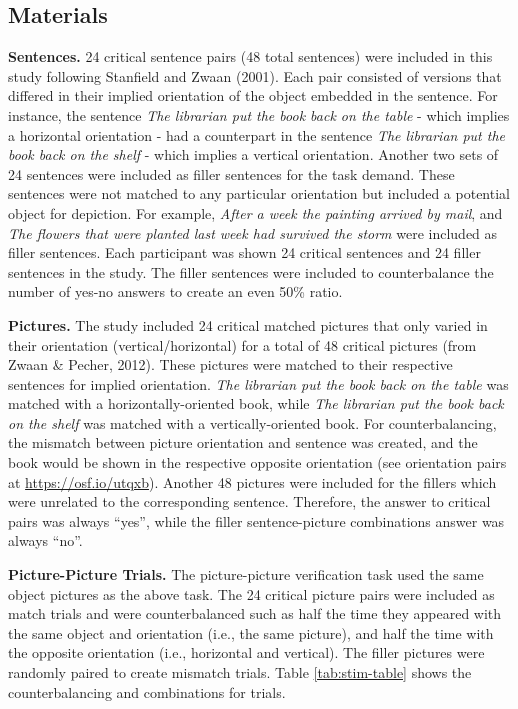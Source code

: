 \documentclass[
  man,floatsintext]{apa7}
\begin{document}
\hypertarget{materials}{%
\subsection{Materials}\label{materials}}

\textbf{Sentences.} 24 critical sentence pairs (48 total sentences) were
included in this study following Stanfield and Zwaan (2001). Each pair
consisted of versions that differed in their implied orientation of the
object embedded in the sentence. For instance, the sentence \emph{The librarian put the book back on the table} - which implies a horizontal
orientation - had a counterpart in the sentence \emph{The librarian put the book back on the shelf} - which implies a vertical orientation. Another two sets of 24 sentences were included as filler sentences for the task demand. These sentences were not matched to any particular orientation but included a potential object for depiction. For example,
\emph{After a week the painting arrived by mail}, and
\emph{The flowers that were planted last week had survived the storm} were included as filler sentences. Each
participant was shown 24 critical sentences and 24 filler sentences in
the study. The filler sentences were included to counterbalance the
number of yes-no answers to create an even 50\% ratio.

\textbf{Pictures.} The study included 24 critical matched pictures that only
varied in their orientation (vertical/horizontal) for a total of 48
critical pictures (from Zwaan \& Pecher, 2012). These pictures were matched to their respective
sentences for implied orientation. \emph{The librarian put the book back on
the table} was matched with a horizontally-oriented book, while \emph{The
librarian put the book back on the shelf} was matched with a
vertically-oriented book. For counterbalancing, the mismatch between
picture orientation and sentence was created, and the book would be
shown in the respective opposite orientation (see orientation pairs at
\url{https://osf.io/utqxb}). Another 48 pictures were included for the
fillers which were unrelated to the corresponding sentence. Therefore,
the answer to critical pairs was always ``yes'', while the filler
sentence-picture combinations answer was always ``no''.

\textbf{Picture-Picture Trials.} The picture-picture verification task used
the same object pictures as the above task. The 24 critical picture
pairs were included as match trials and were counterbalanced such as
half the time they appeared with the same object and orientation (i.e.,
the same picture), and half the time with the opposite orientation
(i.e., horizontal and vertical). The filler pictures were randomly
paired to create mismatch trials. Table \ref{tab:stim-table} shows the
counterbalancing and combinations for trials.
\end{document}
